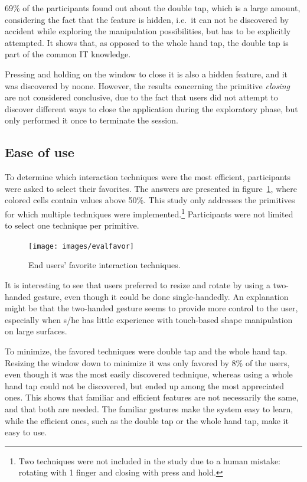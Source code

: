 69\% of the participants found out about the double tap, which is a large amount, considering the fact that the feature is hidden, i.e.\ it can not be discovered by accident while exploring the manipulation possibilities, but has to be explicitly attempted.
It shows that, as opposed to the whole hand tap, the double tap is part of the common IT knowledge.

Pressing and holding on the window to close it is also a hidden feature, and it was discovered by noone.
However, the results concerning the primitive \emph{closing} are not considered conclusive, due to the fact that users did not attempt to discover different ways to close the application during the exploratory phase, but only performed it once to terminate the session.

\subsection{Ease of use}

To determine which interaction techniques were the most efficient, participants were asked to select their favorites.
The answers are presented in figure~\ref{fig:evalfavor}, where colored cells contain values above 50\%.
This study only addresses the primitives for which multiple techniques were implemented.\footnote{Two techniques were not included in the study due to a human mistake: rotating with 1 finger and closing with press and hold.}
Participants were not limited to select one technique per primitive.

\begin{figure}[htb]
  \centering
    \texttt{[image: images/evalfavor]}
    \caption{End users' favorite interaction techniques.}
    \label{fig:evalfavor}
\end{figure}

It is interesting to see that users preferred to resize and rotate by using a two-handed gesture, even though it could be done single-handedly.
An explanation might be that the two-handed gesture seems to provide more control to the user, especially when s/he has little experience with touch-based shape manipulation on large surfaces.

To minimize, the favored techniques were double tap and the whole hand tap.
Resizing the window down to minimize it was only favored by 8\% of the users, even though it was the most easily discovered technique, whereas using a whole hand tap could not be discovered, but ended up among the most appreciated ones.
This shows that familiar and efficient features are not necessarily the same, and that both are needed.
The familiar gestures make the system easy to learn, while the efficient ones, such as the double tap or the whole hand tap, make it easy to use.

